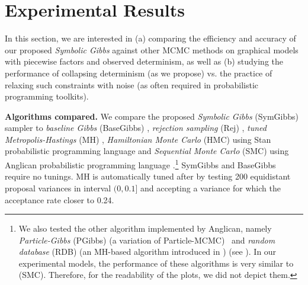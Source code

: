 \documentclass[letterpaper]{article}
\begin{document}
\section{Experimental Results}
\label{sect:experimental.results}
In this section, we are interested in (a) comparing the efficiency and accuracy of our proposed \emph{Symbolic Gibbs} against other MCMC methods on graphical models with piecewise factors and observed determinism, as well as 
(b) studying the performance of collapsing determinism (as we propose) vs. the practice of relaxing such constraints with noise
(as often required in probabilistic programming toolkits). 
%

{\bf Algorithms compared.} 
We compare the proposed \emph{Symbolic Gibbs} (SymGibbs) sampler to
\emph{baseline Gibbs} (BaseGibbs) \cite{pearl1987evidential},
\emph{rejection sampling} (Rej) \cite{hammersley1964monte}, 
\emph{tuned Metropolis-Hastings} (MH) \cite{roberts1997weak}, 
\emph{Hamiltonian Monte Carlo} (HMC) using Stan probabilistic programming language  \cite{stan-manual:2014}
and \emph{Sequential Monte Carlo} (SMC) using Anglican probabilistic programming language \cite{wood2014new}.\footnote{
We also tested the other algorithm implemented by Anglican, namely 
\emph{Particle-Gibbs} (PGibbs) (a variation of Particle-MCMC\cite{andrieu2010particle}) \
and \emph{random database} (RDB) (an MH-based algorithm introduced in \cite{wingate2011lightweight}) (see \cite{wood2014new}).
In our experimental models, the performance of these algorithms is very similar to (SMC).
Therefore, for the readability of the plots, we did not depict them.
}
SymGibbs and BaseGibbs require no tunings. 
MH is automatically tuned after \cite{roberts1997weak} by testing 200 equidistant proposal variances in interval 
$(0, 0.1]$ and accepting a variance for which the acceptance rate closer to 0.24.
\end{document}
